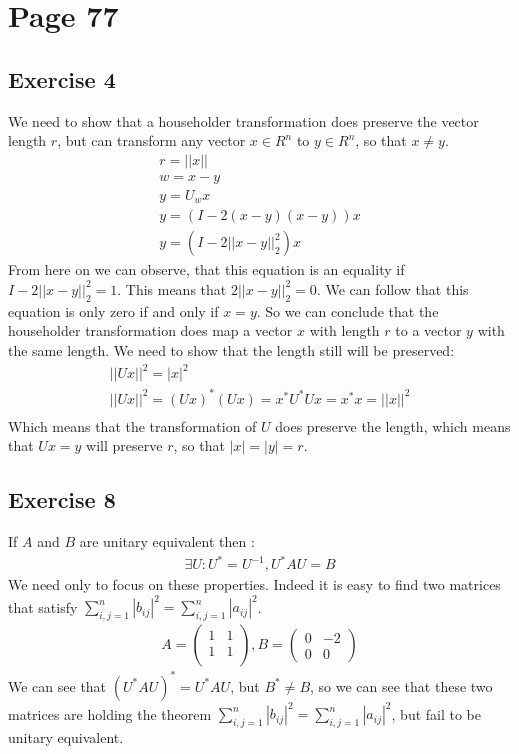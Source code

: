 \section{Page 77}
\subsection{Exercise 4}
We need to show that a householder transformation does preserve the vector length $r$, but can transform any vector $x \in R^n$ to $y \in R^n$, so that $x \neq y$.
\begin{gather*}
r = ||x|| \\
w = x-y \\
y = U_w x \\
y = \left( I - 2 \left( x-y \right) \left( x-y \right) \right) x \\
y =\left( I - 2 \left|\left| x-y \right|\right|_2^2 \right) x
\end{gather*}
From here on we can observe, that this equation is an equality if $I - 2 \left|\left| x-y \right|\right|_2^2 = 1$.
This means that $2 \left|\left| x-y \right|\right|_2^2 = 0$.
We can follow that this equation is only zero if and only if $x = y$.
So we can conclude that the householder transformation does map a vector $x$ with length $r$ to a vector $y$ with the same length.
We need to show that the length still will be preserved:
\begin{gather*}
\left|\left| Ux \right| \right|^2 = \left| x \right|^2\\
\left|\left| Ux \right| \right|^2 = (Ux)^* (Ux) = x^*U^*Ux = x^*x = \left|\left| x \right| \right|^2\\
\end{gather*}
Which means that the transformation of $U$ does preserve the length, which means that $Ux =y$ will preserve $r$, so that $|x| = |y| = r$.
\subsection{Exercise 8}
If $A$ and $B$ are unitary equivalent then :
\begin{gather*}
\exists U : U^* = U^{-1}, U^*AU = B
\end{gather*}
We need only to focus on these properties. Indeed it is easy to find two matrices that satisfy $ \sum\limits_{i,j=1}^n |b_{ij}|^2 = \sum\limits_{i,j=1}^n |a_{ij}|^2$.
\begin{gather*}
A = \left( \begin{array}{cc}
1 & 1 \\
1 & 1 \\
\end{array} \right) ,
B = \left( \begin{array}{cc}
0 & -2 \\
0 & 0
\end{array} \right) 
\end{gather*}
We can see that $(U^*AU)^* = U^*AU$, but $B^* \neq B $, so we can see that these two matrices are holding the theorem $ \sum\limits_{i,j=1}^n |b_{ij}|^2 = \sum\limits_{i,j=1}^n |a_{ij}|^2$, but fail to be unitary equivalent.

